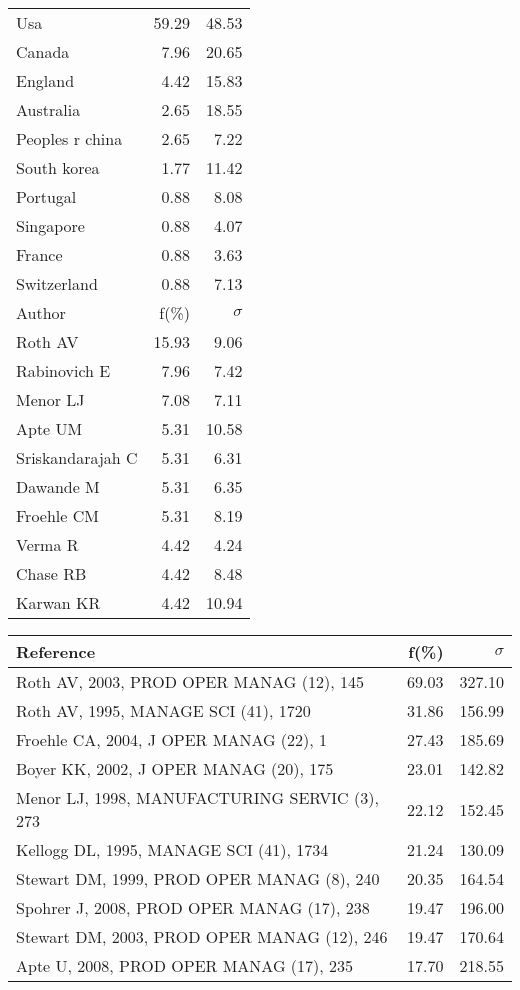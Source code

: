 \documentclass[a4paper,11pt]{report}
\begin{document}
\begin{landscape}
\begin{table}[!ht]
{\begin{tabular}{|l r r|}
\hline
Usa & 59.29 & 48.53\\
Canada & 7.96 & 20.65\\
England & 4.42 & 15.83\\
Australia & 2.65 & 18.55\\
Peoples r china & 2.65 & 7.22\\
South korea & 1.77 & 11.42\\
Portugal & 0.88 & 8.08\\
Singapore & 0.88 & 4.07\\
France & 0.88 & 3.63\\
Switzerland & 0.88 & 7.13\\
\hline
\hline
Author & f(\%) & $\sigma$\\
\hline
Roth AV & 15.93 & 9.06\\
Rabinovich E & 7.96 & 7.42\\
Menor LJ & 7.08 & 7.11\\
Apte UM & 5.31 & 10.58\\
Sriskandarajah C & 5.31 & 6.31\\
Dawande M & 5.31 & 6.35\\
Froehle CM & 5.31 & 8.19\\
Verma R & 4.42 & 4.24\\
Chase RB & 4.42 & 8.48\\
Karwan KR & 4.42 & 10.94\\
\hline
\end{tabular}
}
{\scriptsize\begin{tabular}{|l r r|}
\hline
Reference & f(\%) & $\sigma$\\
\hline
Roth AV, 2003, PROD OPER MANAG (12), 145 & 69.03 & 327.10\\
Roth AV, 1995, MANAGE SCI (41), 1720 & 31.86 & 156.99\\
Froehle CA, 2004, J OPER MANAG (22), 1 & 27.43 & 185.69\\
Boyer KK, 2002, J OPER MANAG (20), 175 & 23.01 & 142.82\\
Menor LJ, 1998, MANUFACTURING SERVIC (3), 273 & 22.12 & 152.45\\
Kellogg DL, 1995, MANAGE SCI (41), 1734 & 21.24 & 130.09\\
Stewart DM, 1999, PROD OPER MANAG (8), 240 & 20.35 & 164.54\\
Spohrer J, 2008, PROD OPER MANAG (17), 238 & 19.47 & 196.00\\
Stewart DM, 2003, PROD OPER MANAG (12), 246 & 19.47 & 170.64\\
Apte U, 2008, PROD OPER MANAG (17), 235 & 17.70 & 218.55\\

\end{tabular}}
\end{table}
\end{landscape}
\end{document}

